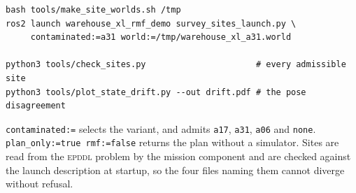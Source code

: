 \documentclass[11pt,a4paper]{article}
\theoremstyle{definition}
\newcommand{\code}[1]{\texttt{\small #1}}
\newcommand{\site}[1]{\code{#1}}
\begin{document}
\begin{lstlisting}
bash tools/make_site_worlds.sh /tmp
ros2 launch warehouse_xl_rmf_demo survey_sites_launch.py \
     contaminated:=a31 world:=/tmp/warehouse_xl_a31.world

python3 tools/check_sites.py                      # every admissible site
python3 tools/plot_state_drift.py --out drift.pdf # the pose disagreement
\end{lstlisting}

\noindent
\code{contaminated:=} selects the variant, and admits \site{a17}, \site{a31},
\site{a06} and \code{none}. \code{plan\_only:=true rmf:=false} returns the plan
without a simulator. Sites are read from the \textsc{epddl} problem by the
mission component and are checked against the launch description at startup,
so the four files naming them cannot diverge without refusal.
\end{document}
